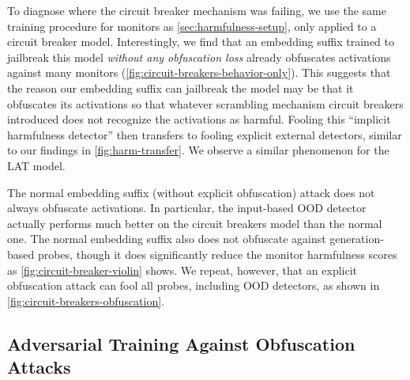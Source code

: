 \documentclass{article}
\begin{document}
To diagnose where the circuit breaker
mechanism was failing, we use the
same training procedure for monitors as \cref{sec:harmfulness-setup},
only applied to a circuit breaker model. 
Interestingly, we find that an
embedding suffix trained to jailbreak this model
\textit{without any obfuscation loss} already obfuscates activations
against many monitors (\cref{fig:circuit-breakers-behavior-only}).
This suggests that the reason our embedding suffix can
jailbreak the model may be that it obfuscates its
activations so that whatever scrambling mechanism
circuit breakers introduced does not recognize the
activations as harmful. Fooling this
\enquote{implicit harmfulness detector} then transfers
to fooling explicit external detectors, similar to our
findings in \cref{fig:harm-transfer}.
We observe a similar phenomenon for the LAT model. 


The normal embedding suffix (without explicit obfuscation)
attack does not always obfuscate activations. In particular,
the input-based OOD detector actually performs much better
on the circuit breakers model than the normal
one.
The normal embedding suffix also does not obfuscate 
against generation-based probes, though it does 
significantly reduce the monitor harmfulness scores
as \cref{fig:circuit-breaker-violin} shows. 
We repeat, however, that an explicit obfuscation attack can 
fool all probes, including OOD detectors, as shown in
\cref{fig:circuit-breakers-obfuscation}.

\subsection{Adversarial Training Against Obfuscation Attacks}
\label{sec:harm-obf-defenses}
\end{document}
